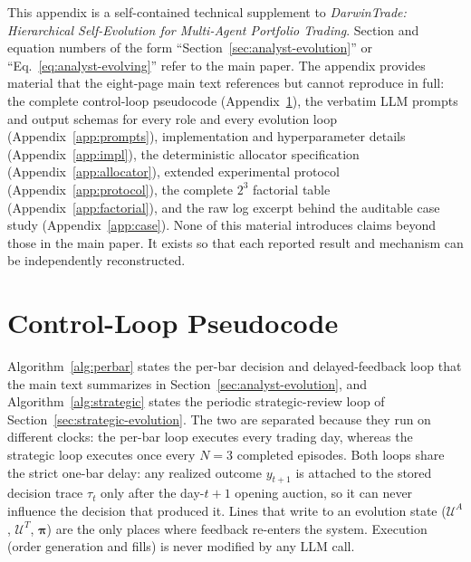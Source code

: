 \documentclass[letterpaper]{article}
\begin{document}
This appendix is a self-contained technical supplement to \emph{DarwinTrade:
Hierarchical Self-Evolution for Multi-Agent Portfolio Trading}. Section and
equation numbers of the form ``Section~\ref{sec:analyst-evolution}'' or
``Eq.~\ref{eq:analyst-evolving}'' refer to the main paper. The appendix provides
material that the eight-page main text references but cannot reproduce in full:
the complete control-loop pseudocode (Appendix~\ref{app:pseudocode}), the verbatim
LLM prompts and output schemas for every role and every evolution loop
(Appendix~\ref{app:prompts}), implementation and hyperparameter details
(Appendix~\ref{app:impl}), the deterministic allocator specification
(Appendix~\ref{app:allocator}), extended experimental protocol
(Appendix~\ref{app:protocol}), the complete $2^3$ factorial table
(Appendix~\ref{app:factorial}), and the raw log excerpt behind the auditable case
study (Appendix~\ref{app:case}). None of this material introduces claims beyond
those in the main paper. It exists so that each reported result and mechanism can
be independently reconstructed.

\section{Control-Loop Pseudocode}
\label{app:pseudocode}

Algorithm~\ref{alg:perbar} states the per-bar decision and delayed-feedback loop
that the main text summarizes in Section~\ref{sec:analyst-evolution}, and
Algorithm~\ref{alg:strategic} states the periodic strategic-review loop of
Section~\ref{sec:strategic-evolution}. The two are separated because they run on
different clocks: the per-bar loop executes every trading day, whereas the
strategic loop executes once every $N=3$ completed episodes. Both loops share the
strict one-bar delay: any realized outcome $y_{t+1}$ is attached to the stored
decision trace $\tau_t$ only after the day-$t{+}1$ opening auction, so it can never
influence the decision that produced it. Lines that write to an evolution state
($\mathcal{U}^A$, $\mathcal{U}^T$, $\boldsymbol{\pi}$) are the only places where
feedback re-enters the system. Execution (order generation and fills) is never
modified by any LLM call.
\end{document}
